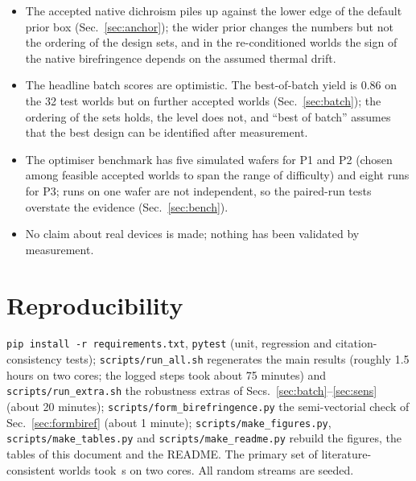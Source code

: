 \documentclass[10pt]{article}
\begin{document}
\begin{itemize}
\item The accepted native dichroism piles up against the lower edge of the default prior box (Sec.~\ref{sec:anchor}); the wider prior changes the numbers but not the ordering of the design sets, and in the re-conditioned worlds the sign of the native birefringence depends on the assumed thermal drift.
\item The headline batch scores are optimistic. The best-of-batch yield is 0.86 on the 32 test worlds but \othPortOther{} on \nOtherWorlds{} further accepted worlds (Sec.~\ref{sec:batch}); the ordering of the sets holds, the level does not, and ``best of batch'' assumes that the best design can be identified after measurement.
\item The optimiser benchmark has five simulated wafers for P1 and P2 (chosen among feasible accepted worlds to span the range of difficulty) and eight runs for P3; runs on one wafer are not independent, so the paired-run tests overstate the evidence (Sec.~\ref{sec:bench}).
\item No claim about real devices is made; nothing has been validated by measurement.
\end{itemize}

\section{Reproducibility}
\sloppy
\texttt{pip install -r requirements.txt}, \texttt{pytest} (unit, regression and citation-consistency tests); \texttt{scripts/run\_all.sh} regenerates the main results (roughly 1.5 hours on two cores; the logged steps took about 75 minutes) and \texttt{scripts/run\_extra.sh} the robustness extras of Secs.~\ref{sec:batch}--\ref{sec:sens} (about 20 minutes); \texttt{scripts/form\_birefringence.py} the semi-vectorial check of Sec.~\ref{sec:formbiref} (about 1 minute); \texttt{scripts/make\_figures.py}, \texttt{scripts/make\_tables.py} and \texttt{scripts/make\_readme.py} rebuild the figures, the tables of this document and the README.
The primary set of literature-consistent worlds took \secAnchored\,s on two cores. All random streams are seeded.




\end{document}
